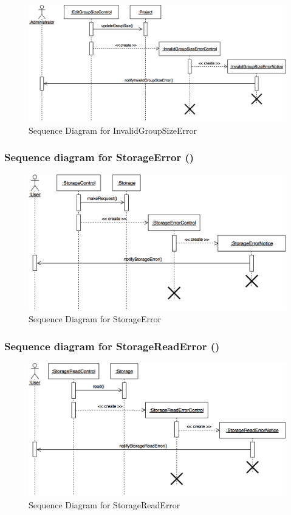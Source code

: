 \documentclass[12pt,letterpaper]{article}
\begin{document}
\begin{figure}[H]
	\centering{}
	\includegraphics[scale=0.3]{imgs/seq/invalid-group-size-error.png}
	\caption{Sequence Diagram for InvalidGroupSizeError}
\end{figure}

\subsubsection*{Sequence diagram for StorageError (\storageerror{})}

\begin{figure}[H]
	\centering{}
	\includegraphics[scale=0.3]{imgs/seq/storage-error.png}
	\caption{Sequence Diagram for StorageError}
\end{figure}

\subsubsection*{Sequence diagram for StorageReadError (\storagereaderror{})}

\begin{figure}[H]
	\centering{}
	\includegraphics[scale=0.3]{imgs/seq/storage-read-error.png}
	\caption{Sequence Diagram for StorageReadError}
\end{figure}
\end{document}
